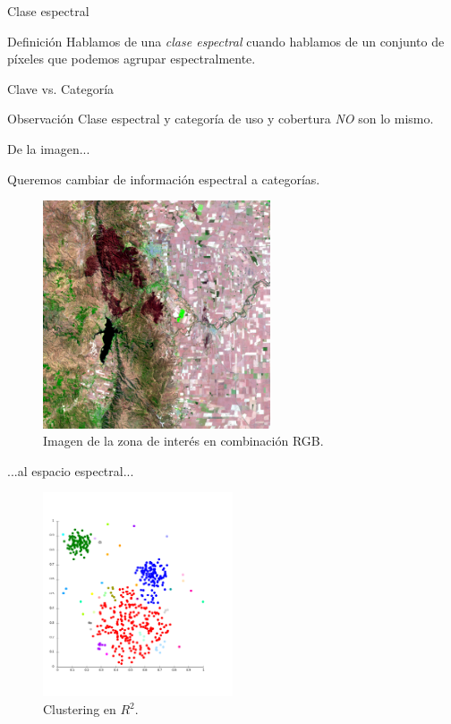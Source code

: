 \documentclass[handout]{beamer}
\begin{document}
\begin{frame}{Clase espectral}
  \begin{block}{Definición}
    Hablamos de una \emph{clase espectral} cuando hablamos de un conjunto de píxeles que podemos agrupar espectralmente.
  \end{block}
\end{frame}

\begin{frame}{Clave vs. Categoría}
  \begin{block}{Observación}
    Clase espectral y categoría de uso y cobertura \emph{NO} son lo mismo.
  \end{block}
\end{frame}

\begin{frame}{De la imagen...}

    Queremos cambiar de información espectral a categorías. \pause
    \begin{figure}
  \includegraphics[width=0.6\textwidth]{imagenes/imagen.png}
  \caption{Imagen de la zona de interés en combinación RGB.}
  \end{figure}
\end{frame}

\begin{frame}{...al espacio espectral...}
  \begin{figure}
    \includegraphics[width=0.5\textwidth]{imagenes/cluster.png}
    \caption{Clustering en $R^2$.}
  \end{figure}
\end{frame}
\end{document}
